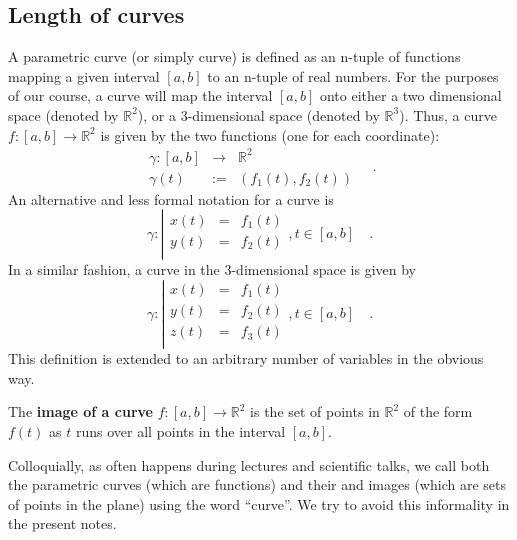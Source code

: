 \documentclass[12pt]{book}
\newcommand{\eqdef}{\textbf{:=}}
\renewcommand{\emph}{\textbf}
\begin{document}
\subsection{Length of curves} \label{secCurveLength}
 A parametric curve (or simply curve) is defined as an n-tuple of functions mapping a given interval $[a,b]$ to an n-tuple of real numbers. For the purposes of our course, a curve will map the interval $[a,b]$ onto either a two dimensional space (denoted by $\mathbb R^2$), or a 3-dimensional space (denoted by $\mathbb R^3$). Thus, a curve $f:[a,b]\to \mathbb R^2$ is given by the two functions (one for each coordinate):
\[
\begin{array}{rcl}
\gamma:[a,b]&\to& \mathbb R^2\\
\gamma(t)&\eqdef& (f_1(t), f_2(t))
\end{array}\quad .
\]
An alternative and less formal notation for a curve is
\[
\gamma:\left|
\begin{array}{rcl}
x(t)&=&f_1(t)\\
y(t)&=&f_2(t)\\
\end{array}\right., t\in [a,b]\quad .
\]
In a similar fashion, a curve in the 3-dimensional space is given by
\[
\gamma:\left|
\begin{array}{rcl}
x(t)&=&f_1(t)\\
y(t)&=&f_2(t)\\
z(t)&=&f_3(t)\\
\end{array}\right., t\in [a,b]\quad .
\]
This definition is extended to an arbitrary number of variables in the obvious way.

The \emph{image of a curve} $f:[a,b]\to \mathbb R^2$ is the set of points in $\mathbb R^2$ of the form $f(t)$ as $t$ runs over all points in the interval $[a,b]$.

Colloquially, as often happens during lectures and scientific talks, we call both the parametric curves (which are functions) and their  and images (which are sets of points in the plane) using the word ``curve''. We try to avoid this informality in the present notes.
\end{document}
